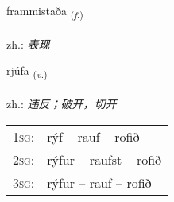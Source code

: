 \documentclass[frontgrid, backgrid]{flacards}\usepackage[]{graphicx}\usepackage[]{xcolor}
\begin{document}
\renewcommand{\flhead}{\vskip5pt \fboxsep=0pt {\small\bfseries\footnotesize Nafnorð | 名词}}
\renewcommand{\fcfoot}{\vskip5pt \fboxsep=0pt \hspace{2pt}{\small\bfseries\footnotesize 3K}}

\renewcommand{\blhead}{\vskip5pt {\small\bfseries\footnotesize Nafnorð | 名词 }}
\renewcommand{\bcfoot}{\vskip5pt \hspace{2pt}{\small\bfseries\footnotesize 3K}}


{frammistaða \small{\textsubscript{(\textit{f.})}} \\[1ex] %
\textphonetic{[framɪstaða]} \\
zh.: \emph{表现} \\  [2ex]
\renewcommand*{\arraystretch}{0.8}
}

\renewcommand{\flhead}{\vskip5pt \fboxsep=0pt {\small\bfseries\footnotesize Sagnorð | 动词}}
\renewcommand{\fcfoot}{\vskip5pt \fboxsep=0pt \hspace{2pt}{\small\bfseries\footnotesize 3K}}

\renewcommand{\blhead}{\vskip5pt {\small\bfseries\footnotesize Sagnorð | 动词 }}
\renewcommand{\bcfoot}{\vskip5pt \hspace{2pt}{\small\bfseries\footnotesize 3K}}


{rjúfa \small{\textsubscript{(\textit{v.})}} \\[1ex] %
\textphonetic{[rjuːva]} \\
zh.: \emph{违反；破开，切开} \\  [2ex]
\renewcommand*{\arraystretch}{0.8}
\begin{tabular}{p{1cm}l}
\textsc{1sg}: & rýf -- rauf -- rofið \\ 
\textsc{2sg}: & rýfur -- raufst -- rofið \\ 
\textsc{3sg}: & rýfur -- rauf -- rofið \\ 
\end{tabular}
}
\end{document}
